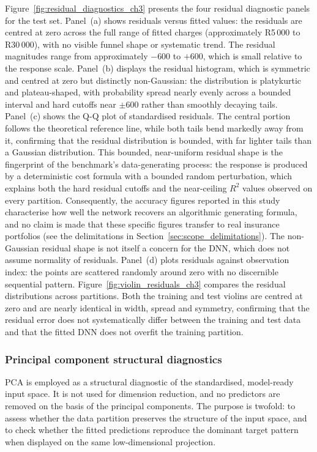 \noindent
Figure~\ref{fig:residual_diagnostics_ch3} presents the four residual
diagnostic panels for the test set. Panel~(a) shows residuals versus fitted
values: the residuals are centred at zero across the full range of fitted
charges (approximately R5\,000 to R30\,000), with no visible funnel shape
or systematic trend. The residual magnitudes range from approximately
$-600$ to $+600$, which is small relative to the response scale.
Panel~(b) displays the residual histogram, which is symmetric and centred
at zero but distinctly non-Gaussian: the distribution is platykurtic and
plateau-shaped, with probability spread nearly evenly across a bounded
interval and hard cutoffs near $\pm 600$ rather than smoothly decaying
tails. Panel~(c) shows the Q-Q plot of standardised residuals. The central
portion follows the theoretical reference line, while both tails bend
markedly away from it, confirming that the residual distribution is
bounded, with far lighter tails than a Gaussian distribution. This
bounded, near-uniform residual shape is the fingerprint of the benchmark's
data-generating process: the response is produced by a deterministic cost
formula with a bounded random perturbation, which explains both the hard
residual cutoffs and the near-ceiling $R^2$ values observed on every
partition. Consequently, the accuracy figures reported in this study
characterise how well the network recovers an algorithmic generating
formula, and no claim is made that these specific figures transfer to real
insurance portfolios (see the delimitations in
Section~\ref{sec:scope_delimitations}). The non-Gaussian residual shape is
not itself a concern for the DNN, which does not assume normality of
residuals. Panel~(d) plots
residuals against observation index: the points are scattered randomly
around zero with no discernible sequential pattern.
Figure~\ref{fig:violin_residuals_ch3} compares the residual distributions
across partitions. Both the training and test violins are centred at zero
and are nearly identical in width, spread and symmetry, confirming that the
residual error does not systematically differ between the training and test
data and that the fitted DNN does not overfit the training partition.

\subsubsection{Principal component structural diagnostics}
\label{sec:pca_structural_diagnostics}

PCA is employed as a structural diagnostic of the standardised,
model-ready input space.  It is not used for dimension reduction, and no
predictors are removed on the basis of the principal components.  The
purpose is twofold: to assess whether the data partition preserves the
structure of the input space, and to check whether the fitted predictions
reproduce the dominant target pattern when displayed on the same
low-dimensional projection.

